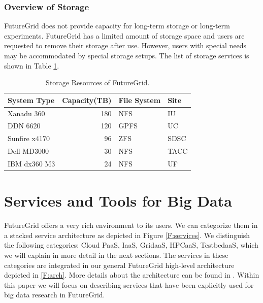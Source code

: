 \documentclass[graybox]{svmult}
\begin{document}
\subsubsection{Overview of Storage}

FutureGrid does not provide capacity for long-term storage or long-term experiments. FutureGrid has a limited amount of storage space and users are requested to remove their storage after use. However, users with special needs may be accommodated by special storage setups. The list of storage services is shown in Table \ref{T:storage}.

\begin{table}[htb]
\caption{Storage Resources of FutureGrid.}
\label{T:storage} 

\centering{}%
\begin{tabular}{lrll}
\textbf{System Type } & \textbf{Capacity(TB) } & \textbf{File System } & \textbf{Site }\tabularnewline
\hline 
Xanadu 360  & 180  & NFS  & IU \tabularnewline
DDN 6620  & 120  & GPFS  & UC \tabularnewline
Sunfire x4170  & 96  & ZFS  & SDSC \tabularnewline
Dell MD3000  & 30  & NFS  & TACC \tabularnewline
IBM dx360 M3  & 24  & NFS  & UF \tabularnewline
\end{tabular}
\end{table}





\section{Services and Tools for Big Data}\label{S:services}

FutureGrid offers a very rich environment to its users. We can categorize them in a stacked service architecture as depicted in Figure \ref{F:services}. We distinguish the following categories: Cloud PaaS, IaaS, GridaaS, HPCaaS, TestbedaaS, which we will explain in more detail in the next sections. The services in these categories are integrated in our general FutureGrid high-level architecture depicted in \ref{F:arch}. More details about the architecture can be found in \cite{las2010gce,las12fg-bookchapter}. Within this paper we will focus on describing services that have been explicitly used for big data research in FutureGrid.
\end{document}
